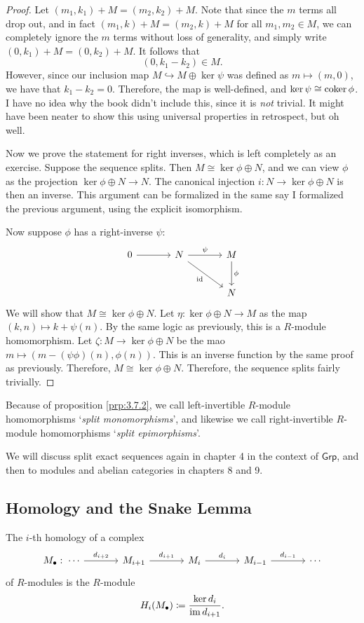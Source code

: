 \begin{proof}
	Let $(m_1,k_1)+M=(m_2,k_2)+M$. Note that since the $m$ terms all drop out, and in fact $(m_1,k)+M=(m_2,k)+M$ for all $m_1,m_2\in M$, we can completely ignore the $m$ terms without loss of generality, and simply write $(0,k_1)+M=(0,k_2)+M$. It follows that
	\[
		(0,k_1-k_2)\in M
	.\]
	However, since our inclusion map $M\hookrightarrow M\oplus \ker \psi $ was defined as $m\mapsto (m,0)$, we have that $k_1-k_2=0$. Therefore, the map is well-defined, and $\ker \psi \cong \operatorname{coker} \phi $. I have no idea why the book didn't include this, since it is \emph{not} trivial. It might have been neater to show this using universal properties in retrospect, but oh well.

	Now we prove the statement for right inverses, which is left completely as an exercise. Suppose the sequence splits. Then $M\cong \ker \phi \oplus N$, and we can view $\phi $ as the projection $\ker \phi \oplus N \to N$. The canonical injection $i : N \to \ker \phi \oplus N$ is then an inverse. This argument can be formalized in the same say I formalized the previous argument, using the explicit isomorphism.

	Now suppose $\phi $ has a right-inverse $\psi $:
	\[\begin{tikzcd}[row sep=2.5em, column sep=3.5em]
		0\arrow[r]&N\arrow[r, "\psi "]\arrow[dr, "\mathrm{id} "']&M\arrow[d, "\phi "]\\
			  &&N
	\end{tikzcd}\]
	We will show that $M\cong \ker \phi \oplus N$. Let $\eta : \ker \phi \oplus N \to M$ as the map $(k,n)\mapsto k+\psi (n)$. By the same logic as previously, this is a $R$-module homomorphism. Let $\zeta : M \to \ker \phi \oplus N$ be the mao $m\mapsto (m-(\psi \phi )(n),\phi (n))$. This is an inverse function by the same proof as previously. Therefore, $M\cong \ker \phi \oplus N$. Therefore, the sequence splits fairly trivially.
\end{proof}

Because of proposition \ref{prp:3.7.2}, we call left-invertible $R$-module homomorphisms `\emph{split monomorphisms}', and likewise we call right-invertible $R$-module homomorphisms  `\emph{split epimorphisms}'.

We will discuss split exact sequences again in chapter 4 in the context of $\mathsf{Grp}$, and then to modules and abelian categories in chapters 8 and 9.

\subsection{Homology and the Snake Lemma}
\begin{definition}[Homology]\label{dfn:3.7.3}
	The $i$-th homology of a complex
	\[\begin{tikzcd}[row sep=2.5em, column sep=3.5em]
		M_{\bullet}: \; \cdots\arrow[r, "d_{i+2}"]&M_{i+1}\arrow[r, "d_{i+1}"]&M_i\arrow[r, "d_i"]&M_{i-1}\arrow[r, "d_{i-1}"]&\cdots
	\end{tikzcd}\]
	of $R$-modules is the $R$-module
	\[
		H_i(M_\bullet)\coloneqq \frac{\ker d_i}{\operatorname{im} d_{i+1}}
	.\]
	
\end{definition}

